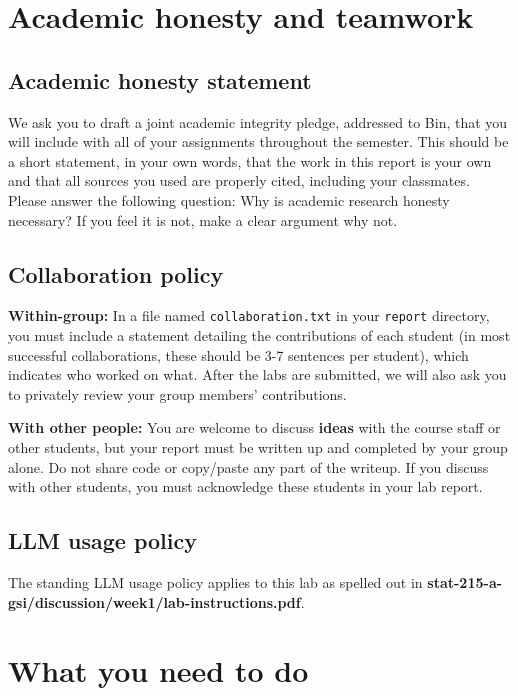 \documentclass[letterpaper,12pt]{article}
\begin{document}
\section{Academic honesty and teamwork}

\subsection{Academic honesty statement}

We ask you to draft a joint academic integrity pledge, addressed to Bin, that you will include with all of your assignments throughout the semester. This should be a short statement, in your own words, that the work in this report is your own and that all sources you used are properly cited, including your classmates. Please answer the following question: Why is academic research honesty necessary? If you feel it is not, make a clear argument why not.

\subsection{Collaboration policy}

\textbf{Within-group:} In a file named \texttt{collaboration.txt} in your \texttt{report} directory, you must include a statement detailing the contributions of each student (in most successful collaborations, these should be 3-7 sentences per student), which indicates who worked on what. After the labs are submitted, we will also ask you to privately review your group members' contributions.

\textbf{With other people:} 
You are welcome to discuss \textbf{ideas} with the course staff or other students, but your report must be written up and completed by your group alone. Do not share code or copy/paste any part of the writeup. If you discuss with other students, you must acknowledge these students in your lab report.

\subsection{LLM usage policy}

The standing LLM usage policy applies to this lab as spelled out in  \textbf{stat-215-a-gsi/discussion/week1/lab-instructions.pdf}.

\section{What you need to do}
\end{document}
